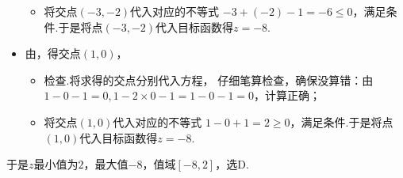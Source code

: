 \begin{exercise}
\begin{itemize}
\begin{itemize}
                \item 将交点$(-3,-2)$代入对应的不等式
                  $-3+(-2)-1=-6\leqslant0$，满足条件.于是将点$(-3,-2)$代入目标函数得$z=-8$.
              \end{itemize}
            \item 由，得交点$(1,0)$，
              \begin{itemize}
                \item 检查.{\kaishu 将求得的交点分别代入方程，
                  仔细笔算检查，确保没算错：由$1-0-1=0,1-2\times0-1=1-0-1=0$，计算正确；}
                \item 将交点$(1,0)$代入对应的不等式
                  $1-0+1=2\geqslant0$，满足条件.于是将点$(1,0)$代入目标函数得$z=-8$.
              \end{itemize}
          \end{itemize}
          于是$z$最小值为$2$，最大值$-8$，值域$[-8,2]$，选D.\\

\end{exercise}
